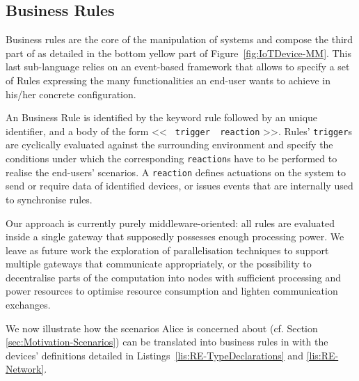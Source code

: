 \subsection{Business Rules}
\label{sec:IoTDSL-BusinessRules}

Business rules are the core of the manipulation of \IOT systems and compose the third part of \IOTDSL as detailed in the bottom yellow part of Figure~\ref{fig:IoTDevice-MM}. This last sub-language relies on an event-based framework that allows to specify a set of \textsf{Rule}s expressing the many functionalities an end-user wants to achieve in his/her concrete configuration. 

An \IOTDSL Business Rule is identified by the keyword \textsf{rule} followed by an unique identifier, and a body of the form << \texttt{\textbf{\color{codeviolet}{when}} trigger \textbf{\color{codeviolet}{do}} reaction} >>. Rules' \texttt{trigger}s are cyclically evaluated against the surrounding environment and specify the conditions under which the corresponding \texttt{reaction}s have to be performed to realise the end-users' scenarios. A \texttt{reaction} defines actuations on the \IOT system to send or require data of identified devices, or issues events that are internally used to synchronise rules. 


Our approach is currently purely middleware-oriented: all rules are evaluated inside a single gateway that supposedly possesses enough processing power. We leave as future work the exploration of parallelisation techniques to support multiple gateways that communicate appropriately, or the possibility to decentralise parts of the computation into nodes with sufficient processing and power resources to optimise resource consumption and lighten communication exchanges. 

We now illustrate how the scenarios Alice is concerned about (cf. Section \ref{sec:Motivation-Scenarios}) can be translated into business rules in \IOTDSL with the devices' definitions detailed in Listings~\ref{lis:RE-TypeDeclarations} and \ref{lis:RE-Network}. 

